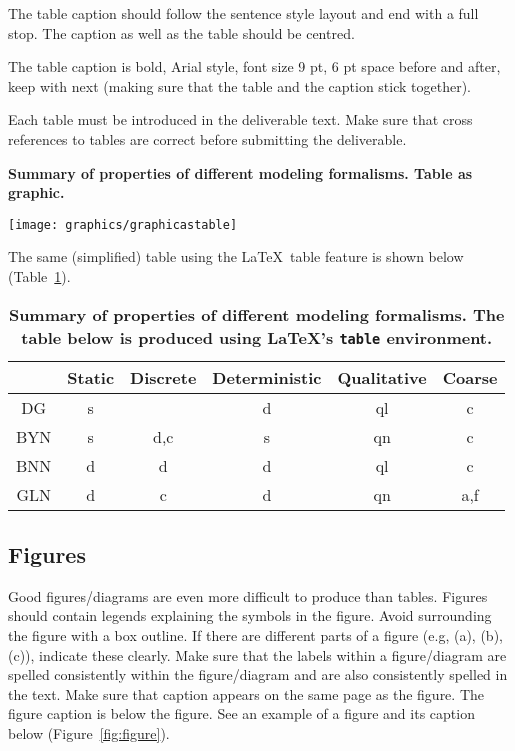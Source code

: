\documentclass[10pt]{report}
\begin{document}
The table caption should follow the sentence style layout and end with
a full stop. The caption as well as the table should be centred.

The table caption is bold, Arial style, font size 9 pt, 6 pt space
before and after, keep with next (making sure that the table and the
caption stick together).

Each table must be introduced in the deliverable text. Make sure that
cross references to tables are correct before submitting the
deliverable.

\begin{table}[htb]
  \centering
  \caption{\bf Summary of properties of different modeling formalisms.
    Table as graphic.}
  \label{tab:graphicastable}
\texttt{[image: graphics/graphicastable]}  
\end{table}

The same (simplified) table using the \LaTeX\ table feature is shown
below (Table~\ref{tab:latextable}).

\begin{table}[htb]
  \centering
  \caption{\bf Summary of properties of different modeling formalisms. The
    table below is produced using \LaTeX's {\tt table} environment.}
  \label{tab:latextable}
  \begin{tabular}{cccccc}
    \hline
    & Static & Discrete & Deterministic & Qualitative & Coarse \\
    \hline
    DG & s &  & d & ql & c \\
    BYN & s & d,c & s & qn & c\\
    BNN & d & d & d & ql & c\\
    GLN & d & c & d & qn & a,f\\
    \hline
  \end{tabular}
\end{table}

\subsection{Figures}

Good figures/diagrams are even more difficult to produce than
tables. Figures should contain legends explaining the symbols in the
figure. Avoid surrounding the figure with a box outline. If there are
different parts of a figure (e.g, (a), (b), (c)), indicate these
clearly. Make sure that the labels within a figure/diagram are spelled
consistently within the figure/diagram and are also consistently
spelled in the text. Make sure that caption appears on the same page
as the figure. The figure caption is below the figure. See an example
of a figure and its caption below (Figure~\ref{fig:figure}).
\end{document}
